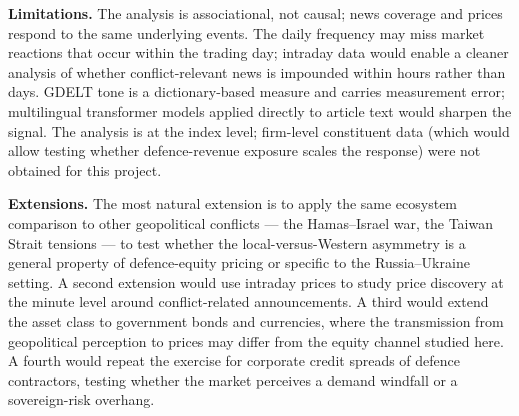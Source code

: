 \documentclass[12pt,a4paper]{article}
\begin{document}
\textbf{Limitations.} The analysis is associational, not causal; news coverage and prices respond to the same underlying events. The daily frequency may miss market reactions that occur within the trading day; intraday data would enable a cleaner analysis of whether conflict-relevant news is impounded within hours rather than days. GDELT tone is a dictionary-based measure and carries measurement error; multilingual transformer models applied directly to article text would sharpen the signal. The analysis is at the index level; firm-level constituent data (which would allow testing whether defence-revenue exposure scales the response) were not obtained for this project.

\textbf{Extensions.} The most natural extension is to apply the same ecosystem comparison to other geopolitical conflicts --- the Hamas--Israel war, the Taiwan Strait tensions --- to test whether the local-versus-Western asymmetry is a general property of defence-equity pricing or specific to the Russia--Ukraine setting. A second extension would use intraday prices to study price discovery at the minute level around conflict-related announcements. A third would extend the asset class to government bonds and currencies, where the transmission from geopolitical perception to prices may differ from the equity channel studied here. A fourth would repeat the exercise for corporate credit spreads of defence contractors, testing whether the market perceives a demand windfall or a sovereign-risk overhang.

\newpage

\end{document}
